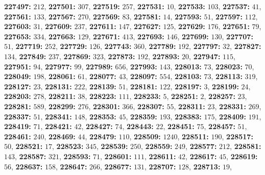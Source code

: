 \textsf{\bfseries 227497:} $212$, \textsf{\bfseries 227501:} $307$, \textsf{\bfseries 227519:} $257$, \textsf{\bfseries 227531:} $10$, \textsf{\bfseries 227533:} $103$, \textsf{\bfseries 227537:} $41$, \textsf{\bfseries 227561:} $133$, \textsf{\bfseries 227567:} $270$, \textsf{\bfseries 227569:} $83$, \textsf{\bfseries 227581:} $14$, \textsf{\bfseries 227593:} $51$, \textsf{\bfseries 227597:} $112$, \textsf{\bfseries 227603:} $31$, \textsf{\bfseries 227609:} $237$, \textsf{\bfseries 227611:} $147$, \textsf{\bfseries 227627:} $125$, \textsf{\bfseries 227629:} $176$, \textsf{\bfseries 227651:} $79$, \textsf{\bfseries 227653:} $334$, \textsf{\bfseries 227663:} $129$, \textsf{\bfseries 227671:} $413$, \textsf{\bfseries 227693:} $146$, \textsf{\bfseries 227699:} $130$, \textsf{\bfseries 227707:} $51$, \textsf{\bfseries 227719:} $252$, \textsf{\bfseries 227729:} $126$, \textsf{\bfseries 227743:} $360$, \textsf{\bfseries 227789:} $192$, \textsf{\bfseries 227797:} $32$, \textsf{\bfseries 227827:} $134$, \textsf{\bfseries 227849:} $237$, \textsf{\bfseries 227869:} $323$, \textsf{\bfseries 227873:} $192$, \textsf{\bfseries 227893:} $20$, \textsf{\bfseries 227947:} $115$, \textsf{\bfseries 227951:} $94$, \textsf{\bfseries 227977:} $99$, \textsf{\bfseries 227989:} $656$, \textsf{\bfseries 227993:} $143$, \textsf{\bfseries 228013:} $73$, \textsf{\bfseries 228023:} $70$, \textsf{\bfseries 228049:} $198$, \textsf{\bfseries 228061:} $61$, \textsf{\bfseries 228077:} $43$, \textsf{\bfseries 228097:} $554$, \textsf{\bfseries 228103:} $73$, \textsf{\bfseries 228113:} $319$, \textsf{\bfseries 228127:} $23$, \textsf{\bfseries 228131:} $222$, \textsf{\bfseries 228139:} $51$, \textsf{\bfseries 228181:} $122$, \textsf{\bfseries 228197:} $3$, \textsf{\bfseries 228199:} $24$, \textsf{\bfseries 228203:} $278$, \textsf{\bfseries 228211:} $38$, \textsf{\bfseries 228223:} $111$, \textsf{\bfseries 228233:} $5$, \textsf{\bfseries 228251:} $2$, \textsf{\bfseries 228257:} $23$, \textsf{\bfseries 228281:} $589$, \textsf{\bfseries 228299:} $276$, \textsf{\bfseries 228301:} $366$, \textsf{\bfseries 228307:} $55$, \textsf{\bfseries 228311:} $23$, \textsf{\bfseries 228331:} $269$, \textsf{\bfseries 228337:} $51$, \textsf{\bfseries 228341:} $148$, \textsf{\bfseries 228353:} $45$, \textsf{\bfseries 228359:} $193$, \textsf{\bfseries 228383:} $175$, \textsf{\bfseries 228409:} $191$, \textsf{\bfseries 228419:} $71$, \textsf{\bfseries 228421:} $42$, \textsf{\bfseries 228427:} $74$, \textsf{\bfseries 228443:} $22$, \textsf{\bfseries 228451:} $75$, \textsf{\bfseries 228457:} $51$, \textsf{\bfseries 228461:} $240$, \textsf{\bfseries 228469:} $44$, \textsf{\bfseries 228479:} $110$, \textsf{\bfseries 228509:} $1240$, \textsf{\bfseries 228511:} $190$, \textsf{\bfseries 228517:} $50$, \textsf{\bfseries 228521:} $17$, \textsf{\bfseries 228523:} $345$, \textsf{\bfseries 228539:} $250$, \textsf{\bfseries 228559:} $249$, \textsf{\bfseries 228577:} $212$, \textsf{\bfseries 228581:} $143$, \textsf{\bfseries 228587:} $321$, \textsf{\bfseries 228593:} $71$, \textsf{\bfseries 228601:} $111$, \textsf{\bfseries 228611:} $42$, \textsf{\bfseries 228617:} $45$, \textsf{\bfseries 228619:} $56$, \textsf{\bfseries 228637:} $158$, \textsf{\bfseries 228647:} $266$, \textsf{\bfseries 228677:} $131$, \textsf{\bfseries 228707:} $128$, \textsf{\bfseries 228713:} $19$, 
